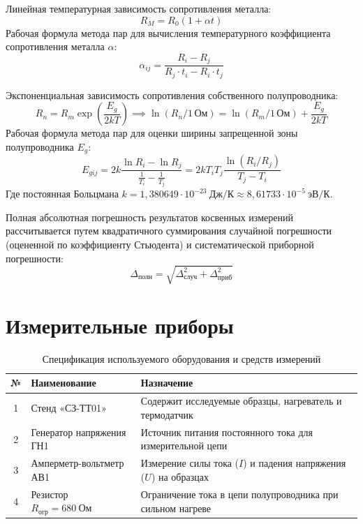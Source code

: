\documentclass[12pt]{article}
\begin{document}
Линейная температурная зависимость сопротивления металла:
\begin{equation} \label{eq:metal_linear}
    R_M = R_0(1 + \alpha t)
\end{equation}
Рабочая формула метода пар для вычисления температурного коэффициента сопротивления металла $\alpha$:
\begin{equation} \label{eq:alpha_pairs}
    \alpha_{ij} = \frac{R_i - R_j}{R_j \cdot t_i - R_i \cdot t_j}
\end{equation}

Экспоненциальная зависимость сопротивления собственного полупроводника:
\begin{equation} \label{eq:semi_exponential}
    R_n = R_m \exp\left(\frac{E_g}{2kT}\right) \implies \ln(R_n / 1\,\text{Ом}) = \ln(R_m / 1\,\text{Ом}) + \frac{E_g}{2kT}
\end{equation}
Рабочая формула метода пар для оценки ширины запрещенной зоны полупроводника $E_g$:
\begin{equation} \label{eq:eg_pairs}
    E_{gij} = 2k \frac{\ln R_i - \ln R_j}{\frac{1}{T_i} - \frac{1}{T_j}} = 2k T_i T_j \frac{\ln(R_i / R_j)}{T_j - T_i}
\end{equation}
Где постоянная Больцмана $k = 1{,}380649 \cdot 10^{-23}~\text{Дж/К} \approx 8{,}61733 \cdot 10^{-5}~\text{эВ/К}$.

Полная абсолютная погрешность результатов косвенных измерений рассчитывается путем квадратичного суммирования случайной погрешности (оцененной по коэффициенту Стьюдента) и систематической приборной погрешности:
\begin{equation} \label{eq:total_error}
    \Delta_{\text{полн}} = \sqrt{\Delta_{\text{случ}}^2 + \Delta_{\text{приб}}^2}
\end{equation}

\section{Измерительные приборы}
\begin{table}[H]
\centering
\caption{Спецификация используемого оборудования и средств измерений}
\vspace{0.2cm}
\small
\begin{tabular}{cll}
\toprule
№ & Наименование & Назначение \\ 
\midrule
1 & Стенд «СЗ-ТТ01» & Содержит исследуемые образцы, нагреватель и термодатчик \\ 
2 & Генератор напряжения ГН1 & Источник питания постоянного тока для измерительной цепи \\ 
3 & Амперметр-вольтметр АВ1 & Измерение силы тока ($I$) и падения напряжения ($U$) на образцах \\
4 & Резистор $R_{\text{огр}} = 680~\text{Ом}$ & Ограничение тока в цепи полупроводника при сильном нагреве \\
\bottomrule
\end{tabular}
\end{table}
\end{document}
